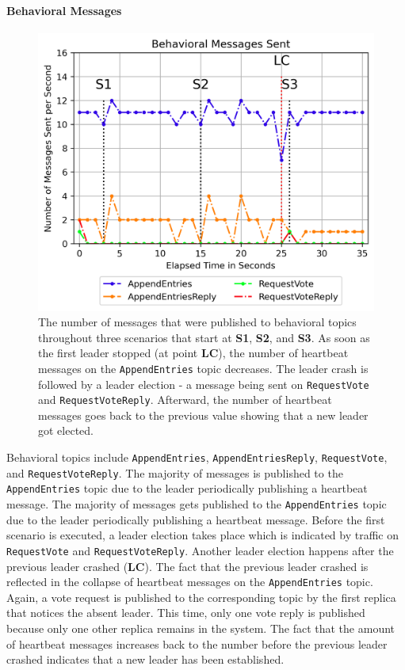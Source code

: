 \paragraph{Behavioral Messages}

\begin{figure}[h!]
	\centering
	\includegraphics[width=0.8\linewidth]{images/plots/ConsensusMessagesSent}
	\caption{The number of messages that were published to behavioral topics throughout three scenarios that start at \textbf{S1}, \textbf{S2}, and \textbf{S3}. As soon as the first leader stopped (at point \textbf{LC}), the number of heartbeat messages on the \texttt{AppendEntries} topic decreases. The leader crash is followed by a leader election - a message being sent on \texttt{RequestVote} and \texttt{RequestVoteReply}. Afterward, the number of heartbeat messages goes back to the previous value showing that a new leader got elected.}
	\label{fig:PlotConsensusMessagesSent}
\end{figure}

Behavioral topics include \texttt{AppendEntries}, \texttt{AppendEntriesReply}, \texttt{RequestVote}, and \texttt{RequestVoteReply}.
The majority of messages is published to the \texttt{AppendEntries} topic due to the leader periodically publishing a heartbeat message.
The majority of messages gets published to the \texttt{AppendEntries} topic due to the leader periodically publishing a heartbeat message.
Before the first scenario is executed, a leader election takes place which is indicated by traffic on \texttt{RequestVote} and \texttt{RequestVoteReply}.
Another leader election happens after the previous leader crashed (\textbf{LC}).
The fact that the previous leader crashed is reflected in the collapse of heartbeat messages on the \texttt{AppendEntries} topic.
Again, a vote request is published to the corresponding topic by the first replica that notices the absent leader.
This time, only one vote reply is published because only one other replica remains in the system.
The fact that the amount of heartbeat messages increases back to the number before the previous leader crashed indicates that a new leader has been established.


